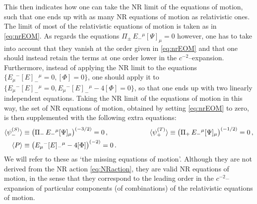 \documentclass[a4paper,10pt,openany]{article}
\begin{document}
	This then indicates how one can take the NR limit of the equations of motion, such that one ends up with as many NR equations of motion as relativistic ones. The limit of most of the relativistic equations of motion is taken as in \eqref{eq:nrEOM}. As regards the equations $\Pi_\pm\,E_-{}^\mu [\Psi]_\mu = 0$ however, one has to take into account that they vanish at the order given in \eqref{eq:nrEOM} and that one should instead retain the terms at one order lower in the $c^{-2}$--expansion. Furthermore, instead of applying the NR limit to the equations $\{E_\mu{}^- [E]_-{}^\mu = 0, [\Phi] = 0\}$, one should apply it to $\{E_\mu{}^- [E]_-{}^\mu = 0, E_\mu{}^- [E]_-{}^\mu - 4 [\Phi]=0\}$, so that one ends up with two linearly independent equations. Taking the NR limit of the equations of motion in this way, the set of NR equations of motion, obtained by setting \eqref{eq:nrEOM} to zero, is then supplemented with the following extra equations:
	\begin{align}\label{eq:missingeoms}
		\langle \psi^{(S)}_-\rangle &\equiv \big(\Pi_-\,E_-{}^\mu [\Psi]_\mu\big)^{(-3/2)} = 0\,, \qquad  \qquad \qquad \langle \psi^{(T)}_+\rangle \equiv \big(\Pi_+\,E_-{}^\mu [\Psi]_\mu\big)^{(-1/2)} = 0 \,, \notag \\
		\langle P \rangle &\equiv \big(E_\mu{}^- [E]_-{}^\mu - 4 [\Phi] \big)^{(-2)} = 0 \,.
	\end{align}
	We will refer to these as `the missing equations of motion'. Although they are not derived from the NR action \eqref{eq:NRaction}, they are valid NR equations of motion, in the sense that they correspond to the leading order in the $c^{-2}$--expansion of particular components (of combinations) of the relativistic equations of motion.
	
\end{document}
